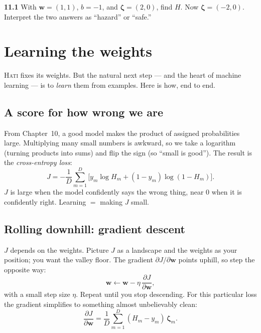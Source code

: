 \documentclass[11pt,oneside]{book}
\begin{document}
\begin{practice}
\textbf{11.1} With $\mathbf w=(1,1)$, $b=-1$, and $\boldsymbol\zeta=(2,0)$, find $H$.
Now $\boldsymbol\zeta=(-2,0)$. Interpret the two answers as ``hazard'' or ``safe.''
\end{practice}

\chapter{Learning the weights}

\textsc{Hati} fixes its weights. But the natural next step --- and the heart of machine
learning --- is to \emph{learn} them from examples. Here is how, end to end.

\section{A score for how wrong we are}
From Chapter~10, a good model makes the product of assigned probabilities large.
Multiplying many small numbers is awkward, so we take a logarithm (turning products
into sums) and flip the sign (so ``small is good''). The result is the
\emph{cross-entropy loss}:
\begin{equation}
J=-\frac1D\sum_{m=1}^{D}\Big[y_m\log H_m+(1-y_m)\log(1-H_m)\Big].
\end{equation}
$J$ is large when the model confidently says the wrong thing, near $0$ when it is
confidently right. Learning $=$ making $J$ small.

\section{Rolling downhill: gradient descent}
$J$ depends on the weights. Picture $J$ as a landscape and the weights as your
position; you want the valley floor. The gradient $\partial J/\partial\mathbf w$ points
uphill, so step the opposite way:
\begin{equation}
\mathbf w\leftarrow\mathbf w-\eta\,\frac{\partial J}{\partial\mathbf w},
\end{equation}
with a small step size $\eta$. Repeat until you stop descending. For this particular
loss the gradient simplifies to something almost unbelievably clean:
\begin{equation}
\boxed{\ \frac{\partial J}{\partial\mathbf w}=\frac1D\sum_{m=1}^{D}(H_m-y_m)\,\boldsymbol\zeta_m.\ }
\label{eq:learnrule}
\end{equation}
\end{document}
